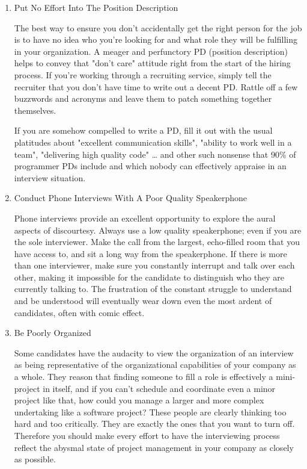 \documentclass{article}
\begin{document}
\begin{enumerate}
\item Put No Effort Into The Position Description
\label{sec:orgheadline58}

The best way to ensure you don't accidentally get the right person for
the job is to have no idea who you're looking for and what role they
will be fulfilling in your organization. A meager and perfunctory PD
(position description) helps to convey that "don't care" attitude right
from the start of the hiring process. If you're working through a
recruiting service, simply tell the recruiter that you don't have time
to write out a decent PD. Rattle off a few buzzwords and acronyms and
leave them to patch something together themselves.

If you are somehow compelled to write a PD, fill it out with the usual
platitudes about "excellent communication skills", "ability to work well
in a team", "delivering high quality code" \ldots{} and other such nonsense
that 90\% of programmer PDs include and which nobody can effectively
appraise in an interview situation.

\item Conduct Phone Interviews With A Poor Quality Speakerphone
\label{sec:orgheadline59}

Phone interviews provide an excellent opportunity to explore the aural
aspects of discourtesy. Always use a low quality speakerphone; even if
you are the sole interviewer. Make the call from the largest,
echo-filled room that you have access to, and sit a long way from the
speakerphone. If there is more than one interviewer, make sure you
constantly interrupt and talk over each other, making it impossible for
the candidate to distinguish who they are currently talking to. The
frustration of the constant struggle to understand and be understood
will eventually wear down even the most ardent of candidates, often with
comic effect.

\item Be Poorly Organized
\label{sec:orgheadline60}

Some candidates have the audacity to view the organization of an
interview as being representative of the organizational capabilities of
your company as a whole. They reason that finding someone to fill a role
is effectively a mini-project in itself, and if you can't schedule and
coordinate even a minor project like that, how could you manage a larger
and more complex undertaking like a software project? These people are
clearly thinking too hard and too critically. They are exactly the ones
that you want to turn off. Therefore you should make every effort to
have the interviewing process reflect the abysmal state of project
management in your company as closely as possible.


\end{enumerate}
\end{document}
